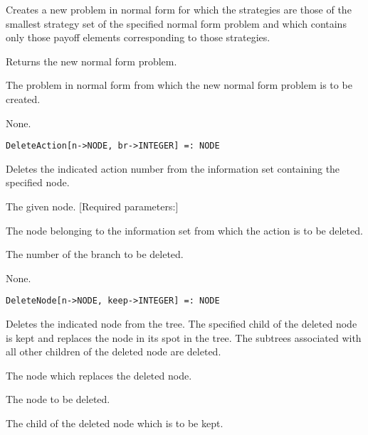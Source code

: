 \begin{itemize}
{{{{{{{{\bd
\item
[Description:] Creates a new problem in normal form for which the 
strategies are those of the smallest strategy set of the specified
normal form problem and which contains only those payoff elements 
corresponding to those strategies.
\item
[Return value:] Returns the new normal form problem.
\item
[Required parameters:]\hfil\null
	
\bd
\item
[ N:] The problem in normal form from which the new normal form
problem is to be created.
\ed

\item  
[Optional parameters:] None.
\ed

\item
\protect \Large{\begin{verbatim}
DeleteAction[n->NODE, br->INTEGER] =: NODE
\end{verbatim}\normalsize

\bd
\item
[Description:] Deletes the indicated action number from the information
set containing the specified node.
\item
[Return value:] The given node.
[Required parameters:]\hfil\null
	
\bd
\item
[ n:] The node belonging to the information set from which the action
is to be deleted.
\item [ br:] The number of the branch to be deleted.
\ed

\item
[Optional parameters:] None.
\ed

\item
\protect \Large{\begin{verbatim}
DeleteNode[n->NODE, keep->INTEGER] =: NODE
\end{verbatim}\normalsize

\bd
\item   
[Description:] Deletes the indicated node from the tree.  The specified
child of the deleted node is kept and replaces the node in its spot in
the tree.  The subtrees associated with all other children of the
deleted node are deleted.
\item
[Return value:] The node which replaces the deleted node.
\item
[Required parameters:]\hfil\null
	
\bd
\item
[ n:] The node to be deleted.
\item
[ keep:] The child of the deleted node which is to be kept.
\ed

}}}}}}}}}}
\end{itemize}
